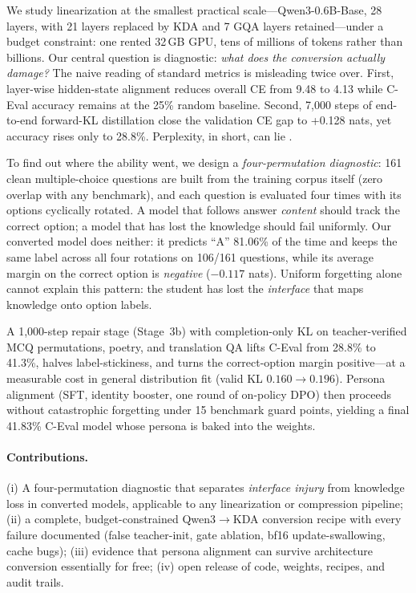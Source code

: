 \documentclass[11pt]{article}
\begin{document}
We study linearization at the smallest practical scale---Qwen3-0.6B-Base,
28 layers, with 21 layers replaced by KDA and 7 GQA layers
retained---under a budget constraint: one rented 32\,GB GPU, tens of
millions of tokens rather than billions. Our central question is
diagnostic: \emph{what does the conversion actually damage?} The naive
reading of standard metrics is misleading twice over. First, layer-wise
hidden-state alignment reduces overall CE from 9.48 to 4.13 while
C-Eval accuracy remains at the 25\% random baseline. Second, 7,000 steps
of end-to-end forward-KL distillation close the validation CE gap to
+0.128 nats, yet accuracy rises only to 28.8\%. Perplexity, in short,
can lie \citep{kostelec2026gendistill}.

To find out where the ability went, we design a \emph{four-permutation
diagnostic}: 161 clean multiple-choice questions are built from the
training corpus itself (zero overlap with any benchmark), and each
question is evaluated four times with its options cyclically rotated.
A model that follows answer \emph{content} should track the correct
option; a model that has lost the knowledge should fail uniformly. Our
converted model does neither: it predicts ``A'' 81.06\% of the time and
keeps the same label across all four rotations on 106/161 questions,
while its average margin on the correct option is \emph{negative}
($-0.117$ nats). Uniform forgetting alone cannot explain this pattern:
the student has lost the \emph{interface} that maps knowledge onto
option labels.

A 1,000-step repair stage (Stage~3b) with completion-only KL on
teacher-verified MCQ permutations, poetry, and translation QA lifts
C-Eval from 28.8\% to 41.3\%, halves label-stickiness, and turns the
correct-option margin positive---at a measurable cost in general
distribution fit (valid KL $0.160 \to 0.196$). Persona alignment (SFT,
identity booster, one round of on-policy DPO) then proceeds without
catastrophic forgetting under 15 benchmark guard points, yielding a
final 41.83\% C-Eval model whose persona is baked into the weights.

\paragraph{Contributions.} (i) A four-permutation diagnostic that
separates \emph{interface injury} from knowledge loss in converted
models, applicable to any linearization or compression pipeline;
(ii) a complete, budget-constrained Qwen3$\to$KDA conversion recipe with
every failure documented (false teacher-init, gate ablation, bf16
update-swallowing, cache bugs); (iii) evidence that persona alignment
can survive architecture conversion essentially for free;
(iv) open release of code, weights, recipes, and audit trails.
\end{document}
